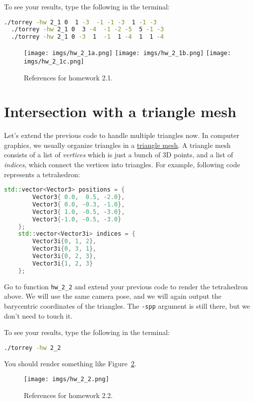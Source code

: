 To see your results, type the following in the terminal:
\begin{lstlisting}[language=bash]
  ./torrey -hw 2_1 0  1 -3  -1 -1 -3  1 -1 -3
  ./torrey -hw 2_1 0  3 -4  -1 -2 -5  5 -1 -3
  ./torrey -hw 2_1 0 -3  1  -1  1 -4  1  1 -4
\end{lstlisting}

\begin{figure}[ht]
    \centering
    \texttt{[image: imgs/hw\_2\_1a.png]}
    \texttt{[image: imgs/hw\_2\_1b.png]}
    \texttt{[image: imgs/hw\_2\_1c.png]}
    \caption{References for homework 2.1.}
    \label{fig:hw_2_1}
\end{figure}

\section{Intersection with a triangle mesh}
Let's extend the previous code to handle multiple triangles now. In computer graphics, we usually organize triangles in a \href{https://en.wikipedia.org/wiki/Triangle_mesh}{triangle mesh}. A triangle mesh consists of a list of \emph{vertices} which is just a bunch of 3D points, and a list of \emph{indices}, which connect the vertices into triangles. For example, following code represents a tetrahedron:
\begin{lstlisting}[language=C++]
    std::vector<Vector3> positions = {
        Vector3{ 0.0,  0.5, -2.0},
        Vector3{ 0.0, -0.3, -1.0},
        Vector3{ 1.0, -0.5, -3.0},
        Vector3{-1.0, -0.5, -3.0}
    };
    std::vector<Vector3i> indices = {
        Vector3i{0, 1, 2},
        Vector3i{0, 3, 1},
        Vector3i{0, 2, 3},
        Vector3i{1, 2, 3}
    };
\end{lstlisting}

Go to function \lstinline{hw_2_2} and extend your previous code to render the tetrahedron above. We will use the same camera pose, and we will again output the barycentric coordinates of the triangles. The \lstinline{-spp} argument is still there, but we don't need to touch it.

To see your results, type the following in the terminal:
\begin{lstlisting}[language=bash]
  ./torrey -hw 2_2
\end{lstlisting}

You should render something like Figure~\ref{fig:hw_2_2}.

\begin{figure}[ht]
    \centering
    \texttt{[image: imgs/hw\_2\_2.png]}
    \caption{References for homework 2.2.}
    \label{fig:hw_2_2}
\end{figure}

